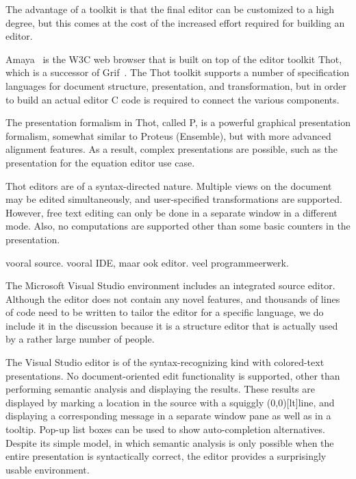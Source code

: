 The advantage of a toolkit is that the final editor can be customized to a high degree, but this comes at the cost of the increased effort required for building an editor. 


Amaya~\cite{amaya04} is the W3C web browser that is built on top of the editor toolkit Thot\cite{quint97thot}, which is a successor of Grif~\cite{quint86grif}. The Thot toolkit supports a number of specification languages for document structure, presentation, and transformation, but in order to build an actual editor C code is required to connect the various components.

The presentation formalism in Thot, called P, is a powerful graphical presentation formalism, somewhat similar to Proteus (Ensemble), but with more advanced alignment features. As a result, complex presentations are possible, such as the presentation for the equation editor use case.

Thot editors are of a syntax-directed nature. Multiple views on the document may be edited simultaneously, and user-specified transformations are supported. However, free text editing can only be done in a separate window in a different mode. Also, no computations are supported other than some basic counters in the presentation. 


\cite{eclipse2001} 
vooral source. vooral IDE, maar ook editor.
veel programmeerwerk.



The Microsoft Visual Studio environment includes an integrated source editor. Although the editor does not contain any novel features, and thousands of lines of code need to be written to tailor the editor for a specific language, we do include it in the discussion because it is a structure editor that is actually used by a rather large number of people. 

The Visual Studio editor is of the syntax-recognizing kind with colored-text presentations. No document-oriented edit functionality is supported, other than performing semantic analysis and displaying the results. These results are displayed by marking a location in the source with a squiggly \makebox(0,0)[lt]{}line, and displaying a corresponding message in a separate window pane as well as in a tooltip. Pop-up list boxes can be used to show auto-completion alternatives. Despite its simple model, in which semantic analysis is only possible when the entire presentation is syntactically correct, the editor provides a surprisingly usable environment. 

